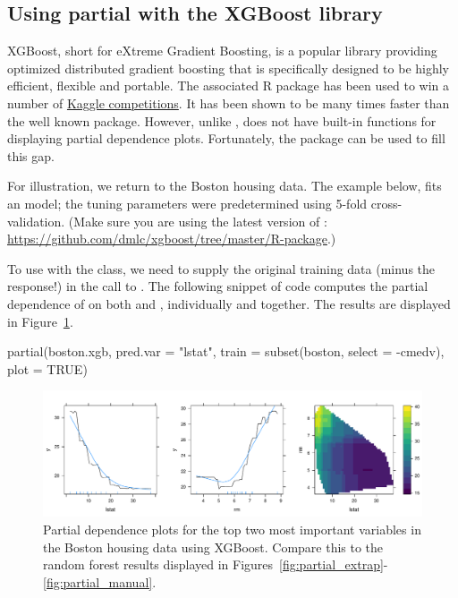 \subsection{Using partial with the XGBoost library}
\label{sec:xgboost}

XGBoost, short for eXtreme Gradient Boosting, is a popular library providing optimized distributed gradient boosting that is specifically designed to be highly efficient, flexible and portable. The associated R package  has been used to win a number of \href{https://www.kaggle.com/}{Kaggle competitions}. It has been shown to be many times faster than the well known  package. However, unlike ,  does not have built-in functions for displaying partial dependence plots. Fortunately, the  package can be used to fill this gap.

For illustration, we return to the Boston housing data. The example below, fits an  model; the tuning parameters were predetermined using 5-fold cross-validation. (Make sure you are using the latest version of : \url{https://github.com/dmlc/xgboost/tree/master/R-package}.)

To use  with the  class, we need to supply the original training data (minus the response!) in the call to . The following snippet of code computes the partial dependence of  on both  and , individually and together. The results are displayed in Figure~\ref{fig:boston_xgb}.
\begin{example}
partial(boston.xgb, pred.var = "lstat", train = subset(boston, select = -cmedv),
        plot = TRUE)
\end{example}

\begin{figure}[htbp]
  \centering
  \includegraphics[width=1.0\linewidth]{boston_xgb}
  \caption{Partial dependence plots for the top two most important variables in the Boston housing data using XGBoost. Compare this to the random forest results displayed in Figures~\ref{fig:partial_extrap}-\ref{fig:partial_manual}.}
  \label{fig:boston_xgb}
\end{figure}

